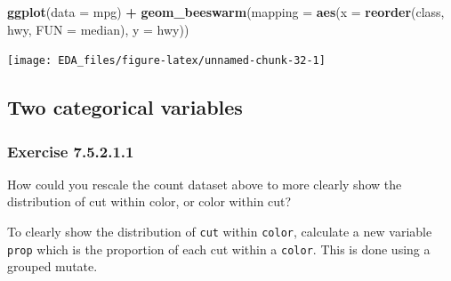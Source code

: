 \documentclass[]{book}
\newenvironment{Shaded}{\begin{snugshade}}{\end{snugshade}}
\newcommand{\CommentTok}[1]{\textcolor[rgb]{0.56,0.35,0.01}{\textit{#1}}}
\newcommand{\DataTypeTok}[1]{\textcolor[rgb]{0.13,0.29,0.53}{#1}}
\newcommand{\DecValTok}[1]{\textcolor[rgb]{0.00,0.00,0.81}{#1}}
\newcommand{\KeywordTok}[1]{\textcolor[rgb]{0.13,0.29,0.53}{\textbf{#1}}}
\newcommand{\NormalTok}[1]{#1}
\newcommand{\OperatorTok}[1]{\textcolor[rgb]{0.81,0.36,0.00}{\textbf{#1}}}
\newcommand{\StringTok}[1]{\textcolor[rgb]{0.31,0.60,0.02}{#1}}
\theoremstyle{plain}
\theoremstyle{remark}
\begin{document}
\begin{Shaded}
\begin{Highlighting}[]
\KeywordTok{ggplot}\NormalTok{(}\DataTypeTok{data =}\NormalTok{ mpg) }\OperatorTok{+}
\StringTok{  }\KeywordTok{geom_beeswarm}\NormalTok{(}\DataTypeTok{mapping =} \KeywordTok{aes}\NormalTok{(}\DataTypeTok{x =} \KeywordTok{reorder}\NormalTok{(class, hwy, }\DataTypeTok{FUN =}\NormalTok{ median),}
                                 \DataTypeTok{y =}\NormalTok{ hwy))}
\end{Highlighting}
\end{Shaded}

\begin{center}\texttt{[image: EDA\_files/figure-latex/unnamed-chunk-32-1]} \end{center}

\hypertarget{two-categorical-variables}{%
\subsection{Two categorical variables}\label{two-categorical-variables}}

\hypertarget{exercise-7.5.2.1.1}{%
\subsubsection*{\texorpdfstring{Exercise {7.5.2.1.1}}{Exercise 7.5.2.1.1}}\label{exercise-7.5.2.1.1}}

How could you rescale the count dataset above to more clearly show the distribution of cut within color, or color within cut?

To clearly show the distribution of \texttt{cut} within \texttt{color}, calculate a new variable \texttt{prop} which is the proportion of each cut within a \texttt{color}.
This is done using a grouped mutate.

\begin{Shaded}
\end{Shaded}
\end{document}
